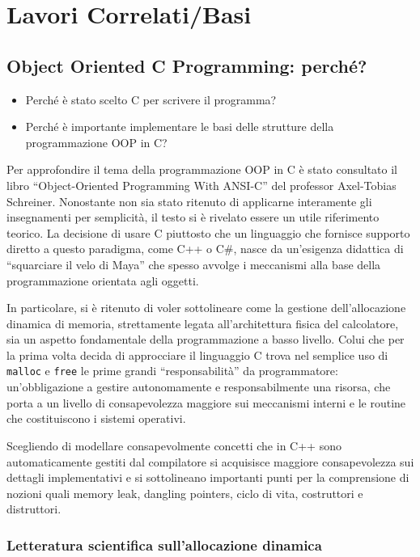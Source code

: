 \chapter{Lavori Correlati/Basi}
\section{Object Oriented C Programming: perché?}

\begin{itemize}
  \item Perché è stato scelto C per scrivere il programma?
  \item Perché è importante implementare le basi delle strutture della programmazione OOP in C?
\end{itemize}

Per approfondire il tema della programmazione OOP in C è stato consultato il libro ``Object-Oriented Programming With ANSI-C'' del professor Axel-Tobias Schreiner. Nonostante non sia stato ritenuto di applicarne interamente gli insegnamenti per semplicità, il testo si è rivelato essere un utile riferimento teorico. La decisione di usare C piuttosto che un linguaggio che fornisce supporto diretto a questo paradigma, come C++ o C\#, nasce da un’esigenza didattica di ``squarciare il velo di Maya'' che spesso avvolge i meccanismi alla base della programmazione orientata agli oggetti.

In particolare, si è ritenuto di voler sottolineare come la gestione dell’allocazione dinamica di memoria, strettamente legata all’architettura fisica del calcolatore, sia un aspetto fondamentale della programmazione a basso livello. Colui che per la prima volta decida di approcciare il linguaggio C trova nel semplice uso di \texttt{malloc} e \texttt{free} le prime grandi ``responsabilità'' da programmatore: un’obbligazione a gestire autonomamente e responsabilmente una risorsa, che porta a un livello di consapevolezza maggiore sui meccanismi interni e le routine che costituiscono i sistemi operativi.

Scegliendo di modellare consapevolmente concetti che in C++ sono automaticamente gestiti dal compilatore si acquisisce maggiore consapevolezza sui dettagli implementativi e si sottolineano importanti punti per la comprensione di nozioni quali memory leak, dangling pointers, ciclo di vita, costruttori e distruttori.

\subsection{Letteratura scientifica sull’allocazione dinamica}

